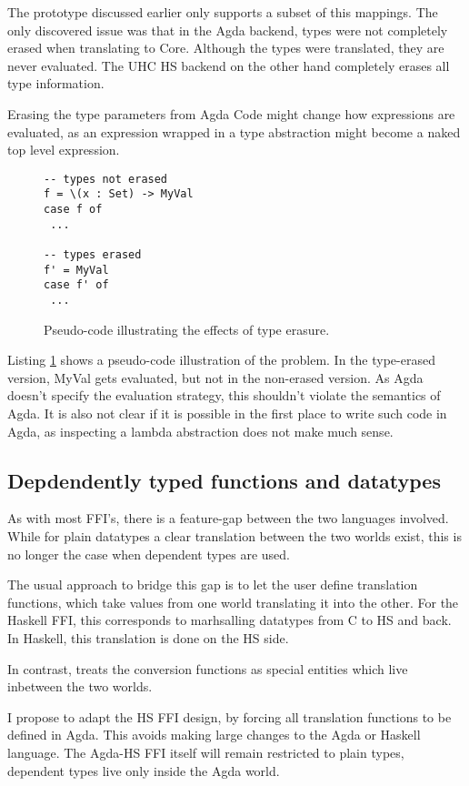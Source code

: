 \documentclass[12pt, a4paper, twoside]{report}
\begin{document}
The prototype discussed earlier only supports a subset of this mappings. The only discovered
issue was that in the Agda backend, types were not completely erased when translating to Core.
Although the types were translated, they are never evaluated. The UHC HS backend on the
other hand completely erases all type information.

Erasing the type parameters from Agda Code might change how expressions are evaluated,
as an expression wrapped in a type abstraction might become a naked top level
expression.
\begin{figure}
\begin{lstlisting}
-- types not erased
f = \(x : Set) -> MyVal
case f of
 ... 

-- types erased
f' = MyVal
case f' of
 ...
\end{lstlisting}
\caption{Pseudo-code illustrating the effects of type erasure.}
\label{lst:pseu-ty-eras}
\end{figure}

Listing \ref{lst:pseu-ty-eras} shows a pseudo-code illustration of the problem.
In the type-erased version, MyVal gets evaluated, but not in the non-erased version. As Agda doesn't specify the
evaluation strategy, this shouldn't violate the semantics of Agda. It is also not clear if
it is possible in the first place to write such code in Agda, as inspecting a lambda abstraction
does not make much sense.

\subsection{Depdendently typed functions and datatypes}
As with most FFI's, there is a feature-gap between the two languages involved. While for plain datatypes a clear
translation between the two worlds exist, this is no longer the case when dependent types are used.

The usual approach to bridge this gap is to let the user define translation functions, which take
values from one world translating it into the other. For the Haskell FFI, this corresponds to marhsalling
datatypes from C to HS and back. In Haskell, this translation is done on the HS side.

In contrast, \cite{Osera:2012:DI:2103776.2103779} treats the conversion functions as special entities
which live inbetween the two worlds.


I propose to adapt the HS FFI design, by forcing all translation functions to be defined in Agda.
This avoids making large changes to the Agda or Haskell language. The Agda-HS FFI itself will remain
restricted to plain types, dependent types live only inside the Agda world.
\end{document}

